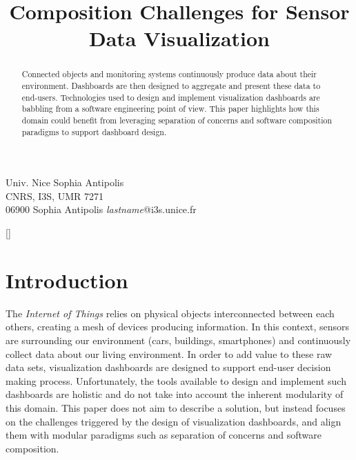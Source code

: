 \documentclass{sigplanconf}
\begin{document}
\setlength{\pdfpageheight}{\paperheight}
\setlength{\pdfpagewidth}{\paperwidth}

\exclusivelicense 

\title{Composition Challenges for Sensor Data Visualization}

  		   {Univ. Nice Sophia Antipolis\\CNRS, I3S, UMR 7271\\06900 Sophia Antipolis}
  		   {\emph{lastname}@i3s.unice.fr}
\maketitle

\begin{abstract}
  Connected objects and monitoring systems continuously produce
  data about their environment. Dashboards are then designed to
  aggregate and present these data to end-users.
  Technologies used to design and implement visualization dashboards
  are babbling from a software engineering point of view. This paper
  highlights how this domain could benefit from leveraging separation
  of concerns and software composition paradigms to support dashboard design.
\end{abstract}

[]


\section{Introduction}

The \emph{Internet of Things} relies on physical objects interconnected
between each others, creating a mesh of devices producing
information. In this context, sensors are surrounding our environment
(\eg cars, buildings, smartphones) and continuously collect data about
our living environment. In order to add value to these raw data sets,
visualization dashboards are designed to support end-user decision
making process. Unfortunately, the tools available to design and
implement such dashboards are holistic and do not take into account
the inherent modularity of this domain. This paper does not aim to
describe a solution, but instead focuses on the challenges triggered
by the design of visualization dashboards, and align them with
modular paradigms such as separation of concerns and software
composition.
\end{document}
